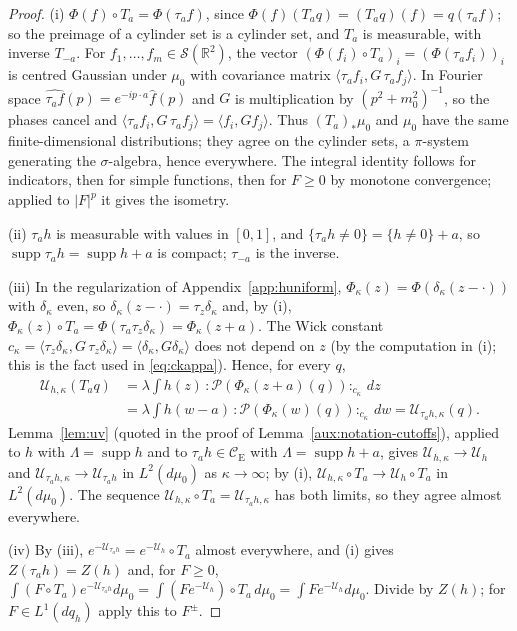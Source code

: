 \documentclass[11pt,a4paper]{article}
\theoremstyle{plain}
\theoremstyle{definition}
\theoremstyle{plain}
\theoremstyle{definition}
\newcommand{\R}{\mathbb{R}}
\newcommand{\CE}{\mathcal{C}_{\mathrm E}}
\newcommand{\ip}[2]{\langle #1,#2\rangle}
\DeclareMathOperator{\supp}{supp}
\newcommand{\Uc}{\mathcal U}
\newcommand{\dmu}{d\mu_0}
\begin{document}
\begin{proof}
(i) $\Phi(f)\circ T_a=\Phi(\tau_af)$, since $\Phi(f)(T_aq)=(T_aq)(f)=q(\tau_af)$; so the
preimage of a cylinder set is a cylinder set, and $T_a$ is measurable, with inverse $T_{-a}$.
For $f_1,\dots,f_m\in\mathcal S(\R^2)$, the vector $(\Phi(f_i)\circ T_a)_i=(\Phi(\tau_af_i))_i$
is centred Gaussian under $\mu_0$ with covariance matrix $\ip{\tau_af_i}{G\,\tau_af_j}$.  In
Fourier space $\widehat{\tau_af}(p)=e^{-ip\cdot a}\hat f(p)$ and $G$ is multiplication by
$(p^2+m_0^2)^{-1}$, so the phases cancel and $\ip{\tau_af_i}{G\,\tau_af_j}=\ip{f_i}{Gf_j}$.
Thus $(T_a)_*\mu_0$ and $\mu_0$ have the same finite-dimensional distributions; they agree on
the cylinder sets, a $\pi$-system generating the $\sigma$-algebra, hence everywhere.  The
integral identity follows for indicators, then for simple functions, then for $F\ge0$ by
monotone convergence; applied to $|F|^p$ it gives the isometry.

(ii) $\tau_ah$ is measurable with values in $[0,1]$, and $\{\tau_ah\ne0\}=\{h\ne0\}+a$, so
$\supp\tau_ah=\supp h+a$ is compact; $\tau_{-a}$ is the inverse.

(iii) In the regularization of Appendix~\ref{app:huniform},
$\Phi_\kappa(z)=\Phi(\delta_\kappa(z-\cdot))$ with $\delta_\kappa$ even, so
$\delta_\kappa(z-\cdot)=\tau_z\delta_\kappa$ and, by (i),
$\Phi_\kappa(z)\circ T_a=\Phi(\tau_a\tau_z\delta_\kappa)=\Phi_\kappa(z+a)$.  The Wick constant
$c_\kappa=\ip{\tau_z\delta_\kappa}{G\,\tau_z\delta_\kappa}=\ip{\delta_\kappa}{G\delta_\kappa}$
does not depend on $z$ (by the computation in (i); this is the fact used in
\eqref{eq:ckappa}).  Hence, for every $q$,
\begin{align*}
 \Uc_{h,\kappa}(T_aq)&=\lambda\int h(z)\,{:}\mathscr P(\Phi_\kappa(z+a)(q)){:}_{c_\kappa}\,dz\\
 &=\lambda\int h(w-a)\,{:}\mathscr P(\Phi_\kappa(w)(q)){:}_{c_\kappa}\,dw
 =\Uc_{\tau_ah,\kappa}(q) .
\end{align*}
Lemma~\ref{lem:uv} (quoted in the proof of Lemma~\ref{aux:notation-cutoffs}), applied
to $h$ with $\Lambda=\supp h$ and
to $\tau_ah\in\CE$ with $\Lambda=\supp h+a$, gives
$\Uc_{h,\kappa}\to\Uc_h$ and $\Uc_{\tau_ah,\kappa}\to\Uc_{\tau_ah}$ in $L^2(\dmu)$ as
$\kappa\to\infty$; by (i), $\Uc_{h,\kappa}\circ T_a\to\Uc_h\circ T_a$ in $L^2(\dmu)$.  The
sequence $\Uc_{h,\kappa}\circ T_a=\Uc_{\tau_ah,\kappa}$ has both limits, so they agree almost
everywhere.

(iv) By (iii), $e^{-\Uc_{\tau_ah}}=e^{-\Uc_h}\circ T_a$ almost everywhere, and (i) gives
$Z(\tau_ah)=Z(h)$ and, for $F\ge0$, $\int(F\circ T_a)e^{-\Uc_{\tau_ah}}\dmu=\int(F
e^{-\Uc_h})\circ T_a\,\dmu=\int Fe^{-\Uc_h}\dmu$.  Divide by $Z(h)$; for $F\in L^1(dq_h)$
apply this to $F^\pm$.
\end{proof}
\end{document}
